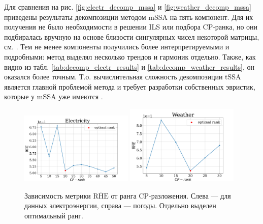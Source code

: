 			Для сравнения на рис. \ref{fig:electr_decomp_mssa} и \ref{fig:weather_decomp_mssa} приведены результаты декомпозиции методом mSSA на пять компонент. Для их получения не было необходимости в решении ILS или подбора CP-ранка, но они подбиралась вручную на основе близости сингулярных чисел некоторой матрицы, см. \cite{ecfb9dc578be43ae9ee8fc88b8ff9151}. Тем не менее компоненты получились более интерпретируемыми и подробными: метод выделял несколько трендов и гармоник отдельно. Также, как видно из табл. \ref{tab:decomp_electr_results} и \ref{tab:decomp_weather_results}, он оказался более точным. Т.о. вычислительная сложность декомпозиции tSSA является главной проблемой метода и требует разработки собственных эвристик, которые у mSSA уже имеются \cite{ecfb9dc578be43ae9ee8fc88b8ff9151}.
			
			\begin{figure}[h!]
				\centering
				\includegraphics[width=0.48\textwidth, keepaspectratio]{../experiments/electricity/tssa/figs/decomposition/RHE_mean.png}
				\includegraphics[width=0.48\textwidth, keepaspectratio]{../experiments/weather/tssa/figs/decomposition/RHE_mean.png}
				\caption{Зависимость метрики $ \overline{\text{RHE}} $ от ранга CP-разложения. Слева --- для данных электроэнергии, справа --- погоды. Отдельно выделен оптимальный ранг.}\label{fig:decomp_rhe_rank}
			\end{figure}
			
